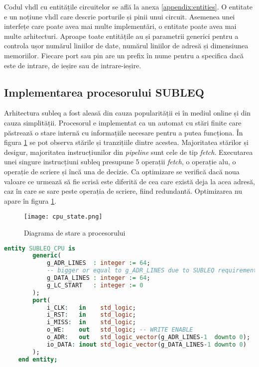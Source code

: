 \documentclass[../main.tex]{subfiles}
\begin{document}
Codul \acrshort{vhdl} cu entitățile circuitelor se află la anexa \ref{appendix:entities}. O entitate e un noțiune \acrshort{vhdl}
care descrie porturile și pinii unui circuit. Asemenea unei interfețe care poate avea mai multe implementări, o entitate poate
avea mai multe arhitecturi. Aproape toate entitățile au și parametrii generici pentru a controla ușor numărul liniilor de date,
numărul liniilor de adresă și dimensiunea memoriilor. Fiecare port sau pin are un prefix în nume pentru a specifica dacă este
de intrare, de ieșire sau de intrare-ieșire.

\subsection{Implementarea procesorului SUBLEQ}
Arhitectura \acrshort{subleq} a fost aleasă din cauza popularității ei în mediul online și din cauza simplității.
Procesorul e implementat ca un automat cu stări finite care păstrează o stare internă cu informațiile necesare
pentru a putea funcționa. În figura \ref{fig:cpu_state} se pot observa stările și tranzițiile dintre acestea.
Majoritatea stărilor și desigur, majoritatea instrucțiunilor din \emph{pipeline} sunt cele de tip \emph{fetch}.
Executarea unei singure instrucțiuni \acrshort{subleq} presupune 5 operații \emph{fetch}, o operație \acrshort{alu},
o operație de scriere și încă una de decizie. Ca optimizare se verifică dacă noua valoare ce urmează să fie scrisă
este diferită de cea care există deja la acea adresă, caz în care se sare peste operația de scriere, fiind
redundantă. Optimizarea nu apare în figura \ref{fig:cpu_state}.

\begin{figure}[h]
    \centering
    \texttt{[image: cpu\_state.png]}
    \caption{Diagrama de stare a procesorului}
    \label{fig:cpu_state}
\end{figure}

\begin{lstlisting}[language=VHDL, caption={Entitatea procesorului}, label={lst:cpu}]
    entity SUBLEQ_CPU is
        generic(
            g_ADR_LINES  : integer := 64;
            -- bigger or equal to g_ADR_LINES due to SUBLEQ requirements
            g_DATA_LINES : integer := 64;
            g_LC_START   : integer := 0
        );
        port(
            i_CLK:   in    std_logic;
            i_RST:   in    std_logic;
            i_MISS:  in    std_logic;
            o_WE:    out   std_logic; -- WRITE ENABLE
            o_ADR:   out   std_logic_vector(g_ADR_LINES-1  downto 0);
            io_DATA: inout std_logic_vector(g_DATA_LINES-1 downto 0) 
        );
    end entity;
\end{lstlisting}
\end{document}
